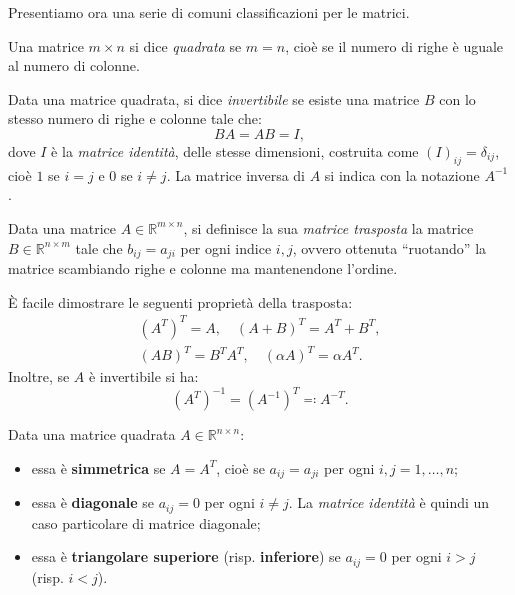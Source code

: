 Presentiamo ora una serie di comuni classificazioni per le matrici.
\begin{definition}
	Una matrice $m\times n$ si dice \textit{quadrata} se $m=n$, cioè se il numero di righe è uguale al numero di colonne.
\end{definition}
\begin{definition}
	Data una matrice quadrata, si dice \textit{invertibile} se esiste una matrice $B$ con lo stesso numero di righe e colonne tale che:
	\begin{equation*}
		BA=AB=I,
	\end{equation*}
	dove $I$ è la \textit{matrice identità}, delle stesse dimensioni, costruita come $( I)_{ij} =\delta _{ij}$, cioè $1$ se $i=j$ e $0$ se $i\neq j$. La matrice inversa di $A$ si indica con la notazione $A^{-1}$.
\end{definition}
\begin{definition}
	Data una matrice $A\in \mathbb{R}^{m\times n}$, si definisce la sua \textit{matrice trasposta} la matrice $B\in \mathbb{R}^{n\times m}$ tale che $b_{ij} = a_{ji}$ per ogni indice $i,j$, ovvero ottenuta ``ruotando'' la matrice scambiando righe e colonne ma mantenendone l'ordine.
\end{definition}
È facile dimostrare le seguenti proprietà della trasposta:
\begin{gather*}
	\left( A^{T}\right)^{T} =A,\quad ( A+B)^{T} =A^{T} +B^{T} ,\\
	( AB)^{T} =B^{T} A^{T} ,\quad ( \alpha A)^{T} =\alpha A^{T}.
\end{gather*}
Inoltre, se $A$ è invertibile si ha:
\begin{equation*}
	\left( A^{T}\right)^{-1} =\left( A^{-1}\right)^{T} \eqqcolon A^{-T}.
\end{equation*}
\begin{definition}
	Data una matrice quadrata $A\in \mathbb{R}^{n\times n}$:
\begin{itemize}
	\item essa è \textbf{simmetrica} se $A=A^{T}$, cioè se $a_{ij} =a_{ji}$ per ogni $i,j=1,\dotsc ,n$;
	\item essa è \textbf{diagonale} se $a_{ij} =0$ per ogni $i\neq j$.
  La \textit{matrice identità} è quindi un caso particolare di matrice diagonale;
	\item essa è \textbf{triangolare superiore} (risp. \textbf{inferiore}) se $a_{ij} =0$ per ogni $i >j$ (risp. $i< j$).
\end{itemize}
\end{definition}

